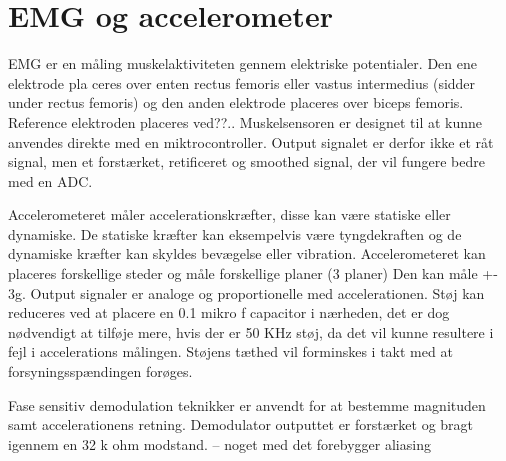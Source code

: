 \section{EMG og accelerometer}

EMG er en måling muskelaktiviteten gennem elektriske potentialer. Den ene elektrode pla
ceres over enten rectus femoris eller vastus intermedius (sidder under rectus femoris) og den anden elektrode placeres over biceps femoris. Reference elektroden placeres ved??.. 
Muskelsensoren er designet til at kunne anvendes direkte med en miktrocontroller. Output signalet er derfor ikke et råt signal, men et forstærket, retificeret og smoothed signal, der vil fungere bedre med en ADC. 


Accelerometeret måler accelerationskræfter, disse kan være statiske eller dynamiske. De statiske kræfter kan eksempelvis være tyngdekraften og de dynamiske kræfter kan skyldes bevægelse eller vibration. Accelerometeret kan placeres forskellige steder og måle forskellige planer (3 planer) 
Den kan måle +- 3g. Output signaler er analoge og proportionelle med accelerationen. Støj kan reduceres ved at placere en 0.1 mikro f capacitor i nærheden, det er dog nødvendigt at tilføje mere, hvis der er 50 KHz støj, da det vil kunne resultere i fejl i accelerations målingen. Støjens tæthed vil forminskes i takt med at forsyningsspændingen forøges. 


Fase sensitiv demodulation teknikker er anvendt for at bestemme magnituden samt accelerationens retning. Demodulator outputtet er forstærket og bragt igennem en 32 k ohm modstand. – noget med det forebygger aliasing 
